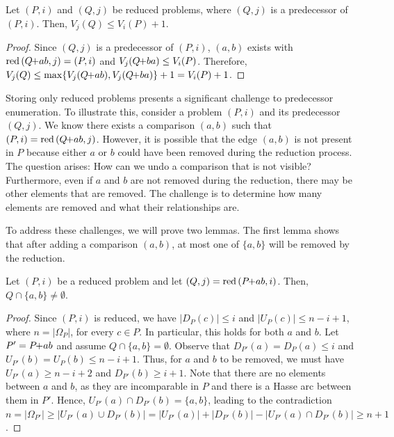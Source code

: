 \documentclass[a4paper,UKenglish,cleveref, autoref, thm-restate]{lipics-v2021}
\newcommand{\pchild}[3]{{#1}\kern-1pt{+}{#2}{#3}}
\newcommand{\reduced}[1]{\operatorname{red}{#1}}
\newcommand{\less}[2]{D_{#1}(#2)}
\newcommand{\greater}[2]{U_{#1}(#2)}
\begin{document}
\begin{lemma} \label{lemma:predecessor_calculation}
  Let $(P, i)$ and $(Q, j)$ be reduced problems, where $(Q, j)$ is a predecessor of $(P, i)$.
  Then, $V_j(Q) \leq V_i(P) + 1$.
\end{lemma}

\begin{proof} \label{proof:predecessor_calculation}
  Since $(Q, j)$ is a predecessor of $(P, i)$, $(a, b)$ exists with $\reduced{(\pchild{Q}{a}{b}, j)} = (P, i)$ and $V_j(\pchild{Q}{b}{a}) \leq V_i(P)$.
  Therefore, $V_j(Q) \leq \max\{V_j(\pchild{Q}{a}{b}), V_j(\pchild{Q}{b}{a})\} + 1 = V_i(P) + 1$.
\end{proof}

Storing only reduced problems presents a significant challenge to predecessor enumeration.
To illustrate this, consider a problem $(P, i)$ and its predecessor $(Q, j)$.
We know there exists a comparison $(a, b)$ such that $(P, i) = \reduced(\pchild{Q}{a}{b}, j)$.
However, it is possible that the edge $(a, b)$ is not present in $P$ because either $a$ or $b$ could have been removed during the reduction process.
The question arises: How can we undo a comparison that is not visible?
Furthermore, even if $a$ and $b$ are not removed during the reduction, there may be other elements that are removed.
The challenge is to determine how many elements are removed and what their relationships are.

To address these challenges, we will prove two lemmas.
The first lemma shows that after adding a comparison $(a, b)$, at most one of $\{a, b\}$ will be removed by the reduction.

\begin{lemma} \label{lemma:remove_only_last_element_edge}
  Let $(P, i)$ be a reduced problem and let $(Q, j) = \reduced{(\pchild{P}{a}{b}, i)}$.
  Then, $Q \cap \{a, b\} \neq \emptyset$.
\end{lemma}

\begin{proof}
  Since $(P, i)$ is reduced, we have $|\less{P}{c}| \leq i$ and $|\greater{P}{c}| \leq n - i + 1$, where $n = |\Omega_P|$, for every $c \in P$.
  In particular, this holds for both $a$ and $b$.
  Let $P' = \pchild{P}{a}{b}$ and assume $Q \cap \{a, b\} = \emptyset$.
  Observe that $\less{P'}{a} = \less{P}{a} \leq i$ and $\greater{P'}{b} = \greater{P}{b} \leq n - i + 1$.
  Thus, for $a$ and $b$ to be removed, we must have $\greater{P'}{a} \geq n - i + 2$ and $\less{P'}{b} \geq i + 1$.
  Note that there are no elements between $a$ and $b$, as they are incomparable in $P$ and there is a Hasse arc between them in $P'$.
  Hence, $\greater{P'}{a} \cap \less{P'}{b} = \{a, b\}$, leading to the contradiction $n = |\Omega_{P'}| \ge |\greater{P'}{a} \cup \less{P'}{b}| = |\greater{P'}{a}| + |\less{P'}{b}| - |\greater{P'}{a} \cap \less{P'}{b}| \ge n + 1$.
\end{proof}
\end{document}
